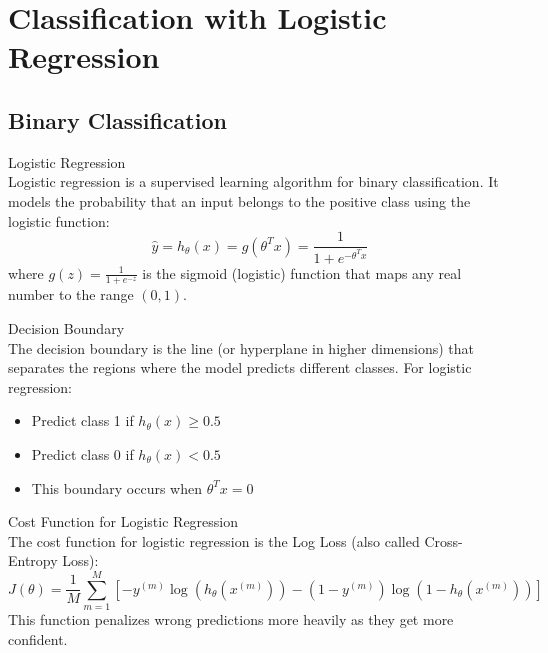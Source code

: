 \section{Classification with Logistic Regression}

\subsection{Binary Classification}

\begin{definition}{Logistic Regression}\\
Logistic regression is a supervised learning algorithm for binary classification. It models the probability that an input belongs to the positive class using the logistic function:
\[\hat{y} = h_\theta(x) = g(\theta^T x) = \frac{1}{1 + e^{-\theta^T x}}\]
where $g(z) = \frac{1}{1 + e^{-z}}$ is the sigmoid (logistic) function that maps any real number to the range $(0,1)$.
\end{definition}

\begin{concept}{Decision Boundary}\\
The decision boundary is the line (or hyperplane in higher dimensions) that separates the regions where the model predicts different classes. For logistic regression:
\begin{itemize}
    \item Predict class 1 if $h_\theta(x) \geq 0.5$ 
    \item Predict class 0 if $h_\theta(x) < 0.5$
    \item This boundary occurs when $\theta^T x = 0$
\end{itemize}
\end{concept}

\begin{definition}{Cost Function for Logistic Regression}\\
The cost function for logistic regression is the Log Loss (also called Cross-Entropy Loss):
\[J(\theta) = \frac{1}{M}\sum_{m=1}^{M}[-y^{(m)}\log(h_\theta(x^{(m)})) - (1-y^{(m)})\log(1-h_\theta(x^{(m)}))]\]
This function penalizes wrong predictions more heavily as they get more confident.
\end{definition}

